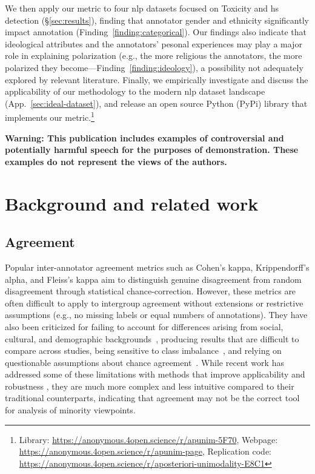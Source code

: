 \documentclass{article} %
\theoremstyle{definition}
\theoremstyle{plain}
\newcommand{\librarylink}{ \url{https://anonymous.4open.science/r/apunim-5F70}}
\newcommand{\doclink}{\url{https://anonymous.4open.science/r/apunim-page}}
\newcommand{\explink}{\url{https://anonymous.4open.science/r/aposteriori-unimodality-E8C1}}
\begin{document}
We then apply our metric to four \ac{nlp} datasets focused on Toxicity and \ac{hs} detection (\S\ref{sec:results}), finding that annotator gender and ethnicity significantly impact annotation (Finding~\ref{finding:categorical}). Our findings also indicate that ideological attributes and the annotators' pesonal experiences may play a major role in explaining polarization (e.g., the more religious the annotators, the more polarized they become---Finding~\ref{finding:ideology}), a possibility not adequately explored by relevant literature. Finally, we empirically investigate and discuss the applicability of our methodology to the modern \ac{nlp} dataset landscape (App.~\ref{sec:ideal-dataset}), and release an open source Python (PyPi) library that implements our metric.\footnote{Library: \librarylink, Webpage: \doclink, Replication code: \explink}

\noindent\textbf{Warning: This publication includes examples of controversial and potentially harmful speech for the purposes of demonstration. These examples do not represent the views of the authors.}


\section{Background and related work}
\label{sec:related}

\subsection{Agreement}
\label{sec:related:agreement}

Popular inter-annotator agreement metrics such as Cohen's kappa, Krippendorff's alpha, and Fleiss's kappa aim to distinguish genuine disagreement from random disagreement through statistical chance-correction. However, these metrics are often difficult to apply to intergroup agreement without extensions or restrictive assumptions (e.g., no missing labels or equal numbers of annotations). They have also been criticized for failing to account for differences arising from social, cultural, and demographic backgrounds~\citep{Feinstein1990, Byrt1993, van_der_Velden, checco_2017}, producing results that are difficult to compare across studies, being sensitive to class imbalance~\citep{Feinstein1990}, and relying on questionable assumptions about chance agreement~\cite{checco_2017}. While recent work has addressed some of these limitations with methods that improve applicability and robustness \cite{van_der_Velden, wong-etal-2021-cross, ivey-etal-2025-nutmeg}, they are much more complex and less intuitive compared to their traditional counterparts, indicating that agreement may not be the correct tool for analysis of minority viewpoints.
\end{document}
